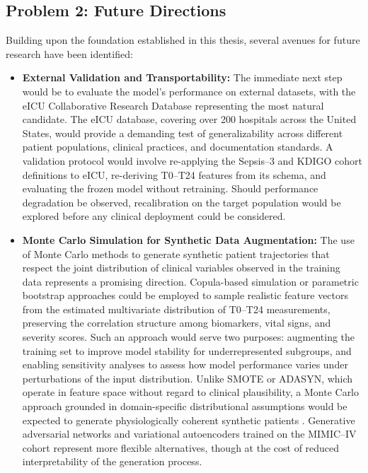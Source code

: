\subsection{Problem 2: Future Directions}
Building upon the foundation established in this thesis, several avenues for future research have been identified:
\begin{itemize}
    \item \textbf{External Validation and Transportability:} The immediate next step would be to evaluate the model's performance on external datasets, with the eICU Collaborative Research Database representing the most natural candidate. The eICU database, covering over 200 hospitals across the United States, would provide a demanding test of generalizability across different patient populations, clinical practices, and documentation standards. A validation protocol would involve re-applying the Sepsis--3 and KDIGO cohort definitions to eICU, re-deriving T0--T24 features from its schema, and evaluating the frozen model without retraining. Should performance degradation be observed, recalibration on the target population would be explored before any clinical deployment could be considered.

    \item \textbf{Monte Carlo Simulation for Synthetic Data Augmentation:} The use of Monte Carlo methods to generate synthetic patient trajectories that respect the joint distribution of clinical variables observed in the training data represents a promising direction. Copula-based simulation or parametric bootstrap approaches could be employed to sample realistic feature vectors from the estimated multivariate distribution of T0--T24 measurements, preserving the correlation structure among biomarkers, vital signs, and severity scores. Such an approach would serve two purposes: augmenting the training set to improve model stability for underrepresented subgroups, and enabling sensitivity analyses to assess how model performance varies under perturbations of the input distribution. Unlike SMOTE or ADASYN, which operate in feature space without regard to clinical plausibility, a Monte Carlo approach grounded in domain-specific distributional assumptions would be expected to generate physiologically coherent synthetic patients \citep{Blagus_2013}. Generative adversarial networks and variational autoencoders trained on the MIMIC--IV cohort represent more flexible alternatives, though at the cost of reduced interpretability of the generation process.


\end{itemize}
